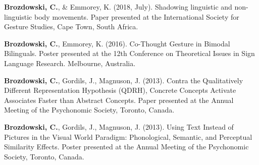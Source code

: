 \begin{cvparagraphlist}
  \textbf{Brozdowski, C.}, \& Emmorey, K. (2018, July). Shadowing linguistic and non-linguistic body movements. Paper presented at the International Society for Gesture Studies, Cape Town, South Africa. \par
  \textbf{Brozdowski, C.}, Emmorey, K. (2016). Co-Thought Gesture in Bimodal Bilinguals. Poster presented at the 12th Conference on Theoretical Issues in Sign Language Research. Melbourne, Australia. \par
  \textbf{Brozdowski, C.}, Gordils, J., Magnuson, J. (2013). Contra the Qualitatively Different Representation Hypothesis (QDRH), Concrete Concepts Activate Associates Faster than Abstract Concepts. Paper presented at the Annual Meeting of the Psychonomic Society, Toronto, Canada. \par
  \textbf{Brozdowski, C.}, Gordils, J., Magnuson, J. (2013). Using Text Instead of Pictures in the Visual World Paradigm: Phonological, Semantic, and Perceptual Similarity Effects. Poster presented at the Annual Meeting of the Psychonomic Society, Toronto, Canada.  \par
\end{cvparagraphlist}

